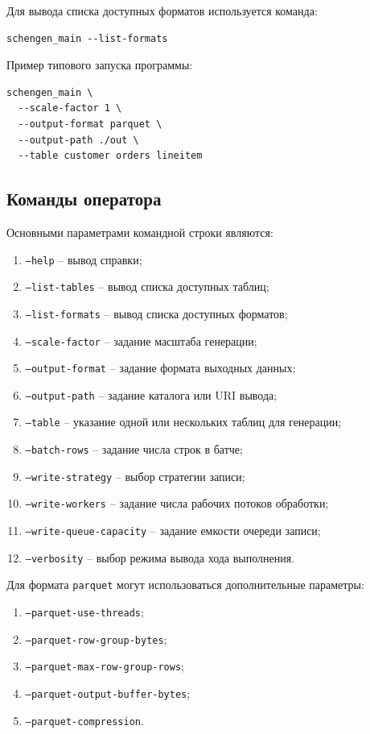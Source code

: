 Для вывода списка доступных форматов используется команда:

\begin{verbatim}
schengen_main --list-formats
\end{verbatim}

Пример типового запуска программы:

\begin{verbatim}
schengen_main \
  --scale-factor 1 \
  --output-format parquet \
  --output-path ./out \
  --table customer orders lineitem
\end{verbatim}

\subsection{Команды оператора}

Основными параметрами командной строки являются:
\begin{enumerate}
    \item \texttt{--help} -- вывод справки;
    \item \texttt{--list-tables} -- вывод списка доступных таблиц;
    \item \texttt{--list-formats} -- вывод списка доступных форматов;
    \item \texttt{--scale-factor} -- задание масштаба генерации;
    \item \texttt{--output-format} -- задание формата выходных данных;
    \item \texttt{--output-path} -- задание каталога или URI вывода;
    \item \texttt{--table} -- указание одной или нескольких таблиц для генерации;
    \item \texttt{--batch-rows} -- задание числа строк в батче;
    \item \texttt{--write-strategy} -- выбор стратегии записи;
    \item \texttt{--write-workers} -- задание числа рабочих потоков обработки;
    \item \texttt{--write-queue-capacity} -- задание емкости очереди записи;
    \item \texttt{--verbosity} -- выбор режима вывода хода выполнения.
\end{enumerate}

Для формата \texttt{parquet} могут использоваться дополнительные параметры:
\begin{enumerate}
    \item \texttt{--parquet-use-threads};
    \item \texttt{--parquet-row-group-bytes};
    \item \texttt{--parquet-max-row-group-rows};
    \item \texttt{--parquet-output-buffer-bytes};
    \item \texttt{--parquet-compression}.
\end{enumerate}

